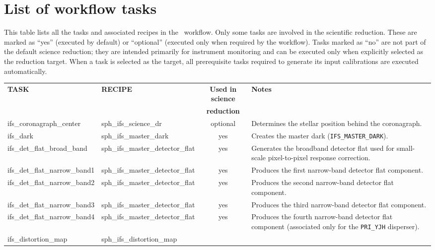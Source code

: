 \section{List of workflow tasks}

This table lists all the tasks and associated recipes in the \instname\ workflow.
Only some tasks are involved in the scientific reduction. These are marked as
``yes'' (executed by default) or ``optional'' (executed only when required by
the workflow). Tasks marked as ``no'' are not part of the default science
reduction; they are intended primarily for instrument monitoring and can be
executed only when explicitly selected as the reduction target. When a task is
selected as the target, all prerequisite tasks required to generate its input
calibrations are executed automatically.

\begin{table}[htbp]
\centering
\scriptsize
\begin{tabular}{|l|l|c|p{7cm}|}
\hline
\textbf{TASK} & \textbf{RECIPE} & \textbf{Used in science} & \textbf{Notes} \\
              &                 & \textbf{reduction} & \\
\hline
ifs\_coronagraph\_center &
sph\_ifs\_science\_dr &
optional &
Determines the stellar position behind the coronagraph. \\
\hline
ifs\_dark &
sph\_ifs\_master\_dark &
yes &
Creates the master dark (\texttt{IFS\_MASTER\_DARK}). \\
\hline
ifs\_det\_flat\_broad\_band &
sph\_ifs\_master\_detector\_flat &
yes &
Generates the broadband detector flat used for small-scale pixel-to-pixel response correction. \\
\hline
ifs\_det\_flat\_narrow\_band1 &
sph\_ifs\_master\_detector\_flat &
yes &
Produces the first narrow-band detector flat component. \\
\hline
ifs\_det\_flat\_narrow\_band2 &
sph\_ifs\_master\_detector\_flat &
yes &
Produces the second narrow-band detector flat component. \\
\hline
ifs\_det\_flat\_narrow\_band3 &
sph\_ifs\_master\_detector\_flat &
yes &
Produces the third narrow-band detector flat component. \\
\hline
ifs\_det\_flat\_narrow\_band4 &
sph\_ifs\_master\_detector\_flat &
yes &
Produces the fourth narrow-band detector flat component (associated only for the \texttt{PRI\_YJH} disperser). \\
\hline
ifs\_distortion\_map &
sph\_ifs\_distortion\_map &

\end{tabular}
\end{table}
